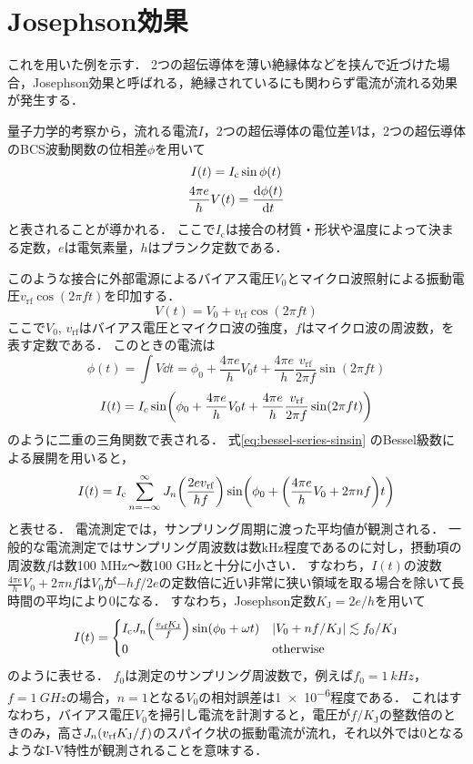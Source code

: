 \documentclass[dvipdfmx,autodetect-engine,12pt,fleqn]{jsarticle}
\begin{document}
\section{Josephson効果}
これを用いた例を示す．
2つの超伝導体を薄い絶縁体などを挟んで近づけた場合，Josephson効果と呼ばれる，絶縁されているにも関わらず電流が流れる効果が発生する．

量子力学的考察から，流れる電流$I$，2つの超伝導体の電位差$V$は，2つの超伝導体のBCS波動関数の位相差$\phi$を用いて
\begin{gather}
    I(t)=I_{\text{c}}\sin\phi(t)\\
    \frac{4\pi e}{h}V(t)=\dv{\phi(t)}{t}
\end{gather}
と表されることが導かれる．
ここで$I_{\text{c}}$は接合の材質・形状や温度によって決まる定数，$e$は電気素量，$h$はプランク定数である．

このような接合に外部電源によるバイアス電圧$V_0$とマイクロ波照射による振動電圧$v_{\text{rf}}\cos(2\pi ft)$を印加する．
\begin{equation}
    V(t)=V_0+v_{\text{rf}}\cos(2\pi ft)
\end{equation}
ここで$V_0$, $v_{\text{rf}}$はバイアス電圧とマイクロ波の強度，$f$はマイクロ波の周波数，を表す定数である．
このときの電流は
\begin{equation}
    \phi(t) = \int V\dd t = \phi_0 + \frac{4\pi e}{h}V_0 t+\frac{4\pi e}{h}\frac{v_{\text{rf}}}{2\pi f}\sin(2\pi ft)
\end{equation}
\begin{equation}
    I(t) = I_c\sin\rbra*{\phi_0 + \frac{4\pi e}{h}V_0 t+\frac{4\pi e}{h}\frac{v_{\text{rf}}}{2\pi f}\sin(2\pi ft)}
\end{equation}
のように二重の三角関数で表される．
式\eqref{eq:bessel-series-sinsin} のBessel級数による展開を用いると，
\begin{equation}
    I(t) = I_{\text{c}}\sum_{n=-\infty}^\infty J_n\rbra*{\frac{2e v_{\text{rf}}}{hf}}
    \sin\rbra*{\phi_0 + \qty(\frac{4\pi e}{h}V_0 + 2\pi n f) t}
\end{equation}
と表せる．
電流測定では，サンプリング周期に渡った平均値が観測される．
一般的な電流測定ではサンプリング周波数は数\si{kHz}程度であるのに対し，摂動項の周波数$f$は数100 \si{MHz}～数100 \si{GHz}と十分に小さい．
すなわち，$I(t)$の波数$\frac{4\pi e}{h}V_0 + 2\pi n f$は$V_0$が$-hf/2e$の定数倍に近い非常に狭い領域を取る場合を除いて長時間の平均により0になる．
すなわち，Josephson定数$K_{\text{J}}=2e/h$を用いて
\begin{equation}
    I(t)=\begin{cases}
        I_{\text{c}} J_n\rbra*{\frac{ v_{\text{rf}}K_{\text{J}}}{f}}\sin(\phi_0+\omega t) & \abs{V_0+nf/K_{\text{J}}}\lesssim f_0/K_{\text{J}}\\
        0 & \text{otherwise}
    \end{cases}
\end{equation}
のように表せる．
$f_0$は測定のサンプリング周波数で，例えば$f_0=\SI{1}{kHz}$，$f=\SI{1}{GHz}$の場合，$n=1$となる$V_0$の相対誤差は\num{1e-6}程度である．
これはすなわち，バイアス電圧$V_0$を掃引し電流を計測すると，電圧が$f/K_{\text{J}}$の整数倍のときのみ，高さ$J_n\lparen{v_{\text{rf}}}K_{\text{J}}/{f}\rparen$のスパイク状の振動電流が流れ，それ以外では0となるようなI-V特性が観測されることを意味する．
\end{document}
